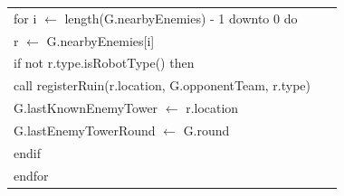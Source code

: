 \documentclass{article}
\newenvironment{pseudobox}
{
\centering
\begin{longtable}{|p{0.94\linewidth}|}
\hline
}
{
\\ \hline
\end{longtable}
\vspace{0.05cm}
}
\begin{document}
\begin{pseudobox}
\hspace*{1em} for i $\leftarrow$ length(G.nearbyEnemies) - 1 downto 0 do \\
\hspace*{2em} r $\leftarrow$ G.nearbyEnemies[i] \\
\hspace*{2em} if not r.type.isRobotType() then \\
\hspace*{3em} call registerRuin(r.location, G.opponentTeam, r.type) \\
\hspace*{3em} G.lastKnownEnemyTower $\leftarrow$ r.location \\
\hspace*{3em} G.lastEnemyTowerRound $\leftarrow$ G.round \\
\hspace*{2em} endif \\
\hspace*{1em} endfor
\end{pseudobox}
\end{document}
